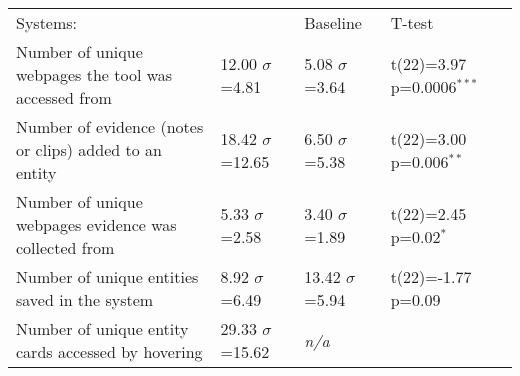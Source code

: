 

\begin{table}
  \centering
  \footnotesize
  \begin{tabular}{p{}  p{} p{} p{}}
  
	
	Systems: &
	{\SYSTEM} &
	Baseline& 
	T-test
	\\
	
	\arrayrulecolor{black}\hline
	
	Number of unique webpages the tool was accessed from &
    12.00 \newline $\sigma$=4.81 &
    5.08  \newline $\sigma$=3.64 &
    t(22)=3.97 \newline p=0.0006$^{***}$
    \\
    
	\arrayrulecolor{mygray}\hline
    
	Number of evidence (notes or clips) added to an entity &
    18.42 \newline $\sigma$=12.65 &
    6.50  \newline $\sigma$=5.38 &
    t(22)=3.00 \newline p=0.006$^{**}$
    \\
    
    \hline

	Number of unique webpages evidence was collected from &
    5.33 \newline $\sigma$=2.58 &
    3.40 \newline $\sigma$=1.89 &
    t(22)=2.45 \newline p=0.02$^{*}$
    \\
    
    \hline
    
	Number of unique entities saved in the system &
    8.92  \newline $\sigma$=6.49 &
    13.42 \newline $\sigma$=5.94 &
    t(22)=-1.77 \newline p=0.09
    \\
    
    \hline
    
	Number of unique entity cards accessed by hovering &
    29.33 \newline $\sigma$=15.62 & 
    \textit{n/a} &
    \\
    
    \hline
    

\end{tabular}
\end{table}
